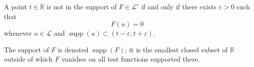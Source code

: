 A point $t \in \mathbb{R}$ is not in the support of $F \in \mathcal{L}'$ if and only if there exists $\varepsilon > 0$ such that
$$F(u) = 0$$
whenever $u \in \mathcal{L}$ and $\operatorname{supp}(u) \subset (t - \varepsilon, t + \varepsilon)$.

The support of $F$ is denoted $\operatorname{supp}(F)$; it is the smallest closed subset of $\mathbb{R}$ outside of which $F$ vanishes on all test functions supported there.
